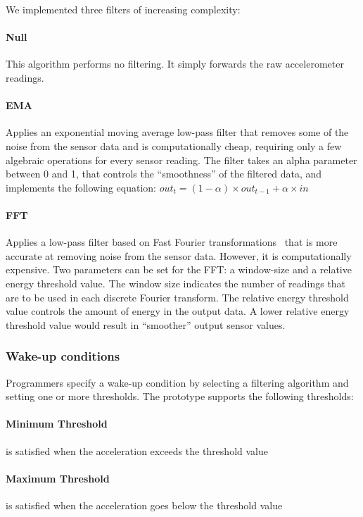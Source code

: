 We implemented three filters of increasing complexity:

\paragraph{Null} This algorithm performs no filtering.  It simply
  forwards the raw accelerometer readings.


  \paragraph{EMA} Applies an exponential moving average low-pass
  filter that removes some of the noise from the sensor data and is
  computationally cheap, requiring only a few algebraic operations for
  every sensor reading. The filter takes an alpha parameter between 0
  and 1, that controls the ``smoothness'' of the filtered data, and
  implements the following equation: $out_{t} = (1-\alpha) \times
  out_{t-1} + \alpha \times in$

  \paragraph{FFT} Applies a low-pass filter based on Fast Fourier
  transformations~\cite{libbyFootstepDetection} that is more accurate
  at removing noise from the sensor data. However, it is
  computationally expensive. Two parameters can be set for the
  FFT: a window-size and a relative energy threshold value. The
  window size indicates the number of readings that are to be used in
  each discrete Fourier transform. The relative energy threshold value
  controls the amount of energy in the output data. A lower relative
  energy threshold value would result in ``smoother'' output sensor
  values.

\subsubsection{Wake-up conditions}

Programmers specify a wake-up condition by selecting a filtering
algorithm and setting one or more thresholds.  The prototype supports
the following thresholds:

\paragraph{Minimum Threshold} is satisfied when the acceleration exceeds the threshold value

\paragraph{Maximum Threshold} is satisfied when the acceleration goes below the threshold value

